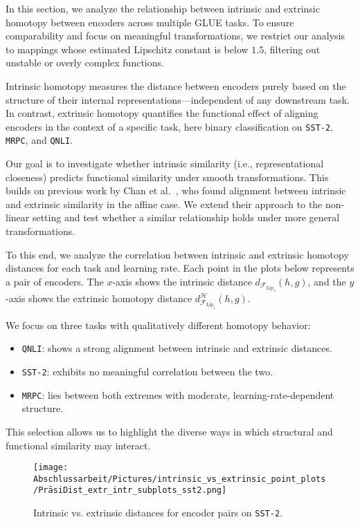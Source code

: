 
In this section, we analyze the relationship between intrinsic and extrinsic homotopy between encoders across multiple GLUE tasks.  
To ensure comparability and focus on meaningful transformations, we restrict our analysis to mappings whose estimated Lipschitz constant is below \( 1.5 \), filtering out unstable or overly complex functions.

Intrinsic homotopy measures the distance between encoders purely based on the structure of their internal representations—independent of any downstream task.  
In contrast, extrinsic homotopy quantifies the functional effect of aligning encoders in the context of a specific task, here binary classification on \texttt{SST-2}, \texttt{MRPC}, and \texttt{QNLI}.

Our goal is to investigate whether intrinsic similarity (i.e., representational closeness) predicts functional similarity under smooth transformations.  
This builds on previous work by Chan et al.~\cite{chan_affine_2024}, who found alignment between intrinsic and extrinsic similarity in the affine case.  
We extend their approach to the non-linear setting and test whether a similar relationship holds under more general transformations.

To this end, we analyze the correlation between intrinsic and extrinsic homotopy distances for each task and learning rate.  
Each point in the plots below represents a pair of encoders. The \( x \)-axis shows the intrinsic distance \( d_{\mathcal{F}_{\mathrm{Lip}_1}}(h, g) \), and the \( y \)-axis shows the extrinsic homotopy distance \( d_{\mathcal{F}_{\mathrm{Lip}_1}}^{\mathcal{H}}(h, g) \).

We focus on three tasks with qualitatively different homotopy behavior:
\begin{itemize}
	\item \texttt{QNLI}: shows a strong alignment between intrinsic and extrinsic distances.
	\item \texttt{SST-2}: exhibits no meaningful correlation between the two.
	\item \texttt{MRPC}: lies between both extremes with moderate, learning-rate-dependent structure.
\end{itemize}

This selection allows us to highlight the diverse ways in which structural and functional similarity may interact.

\begin{figure}[H]
	\centering
	\texttt{[image: Abschlussarbeit/Pictures/intrinsic\_vs\_extrinsic\_point\_plots/PräsiDist\_extr\_intr\_subplots\_sst2.png]}
	\caption{Intrinsic vs. extrinsic distances for encoder pairs on \texttt{SST-2}.}
	\label{fig:intrinsic_vs_extrinsic_sst2}
\end{figure}


